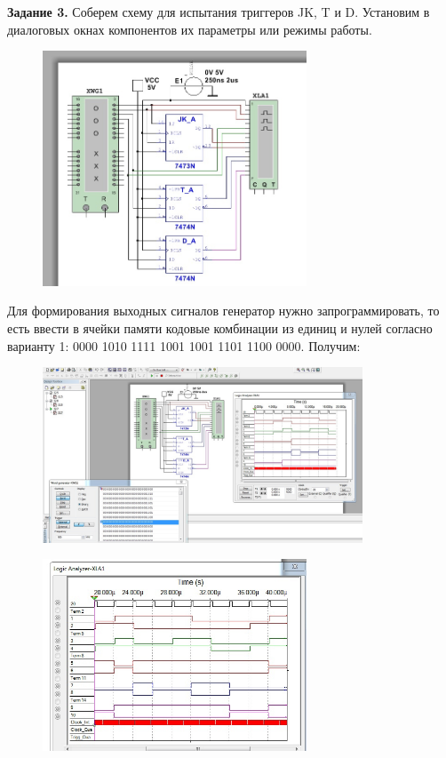 \documentclass[spec, och, labwork]{shiza}
\begin{document}
\textbf{Задание 3.} Соберем схему для испытания триггеров JK, T и D. Установим в диалоговых окнах компонентов их параметры или режимы работы.

\begin{figure}[H]
    \centering
    \includegraphics[width=0.7\textwidth]{img/image10}
    \caption{}
\end{figure}

Для формирования выходных сигналов генератор нужно запрограммировать, то есть ввести в ячейки памяти кодовые комбинации из единиц и нулей согласно варианту 1: 0000 1010 1111 1001 1001 1101 1100 0000. Получим:

\begin{figure}[H]
    \centering
    \includegraphics[width=0.85\textwidth]{img/image11}
    \caption{}
\end{figure}

\begin{figure}[H]
    \centering
    \includegraphics[width=0.7\textwidth]{img/image12}
    \caption{}
\end{figure}
\end{document}
